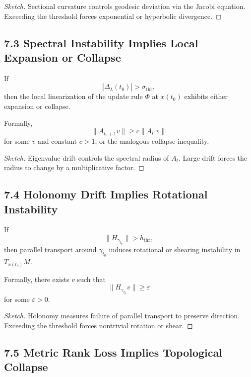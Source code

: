 \begin{proof}[Sketch]
Sectional curvature controls geodesic deviation via the Jacobi equation.
Exceeding the threshold forces exponential or hyperbolic divergence.
\end{proof}

\subsection*{7.3 Spectral Instability Implies Local Expansion or Collapse}

\begin{theorem}
If
\[
|\Delta_\lambda(t_0)| > \sigma_{\mathrm{thr}},
\]
then the local linearization of the update rule $\Phi$ at $x(t_0)$
exhibits either expansion or collapse.

Formally,
\[
\|A_{t_0+1} v\| \ge c \|A_{t_0} v\|
\]
for some $v$ and constant $c > 1$, or the analogous collapse inequality.
\end{theorem}

\begin{proof}[Sketch]
Eigenvalue drift controls the spectral radius of $A_t$. Large drift
forces the radius to change by a multiplicative factor.
\end{proof}

\subsection*{7.4 Holonomy Drift Implies Rotational Instability}

\begin{theorem}
If
\[
\|H_{\gamma_{t_0}}\| > h_{\mathrm{thr}},
\]
then parallel transport around $\gamma_{t_0}$ induces rotational or
shearing instability in $T_{x(t_0)}M$.

Formally, there exists $v$ such that
\[
\|H_{\gamma_{t_0}} v\| \ge \varepsilon
\]
for some $\varepsilon > 0$.
\end{theorem}

\begin{proof}[Sketch]
Holonomy measures failure of parallel transport to preserve direction.
Exceeding the threshold forces nontrivial rotation or shear.
\end{proof}

\subsection*{7.5 Metric Rank Loss Implies Topological Collapse}

